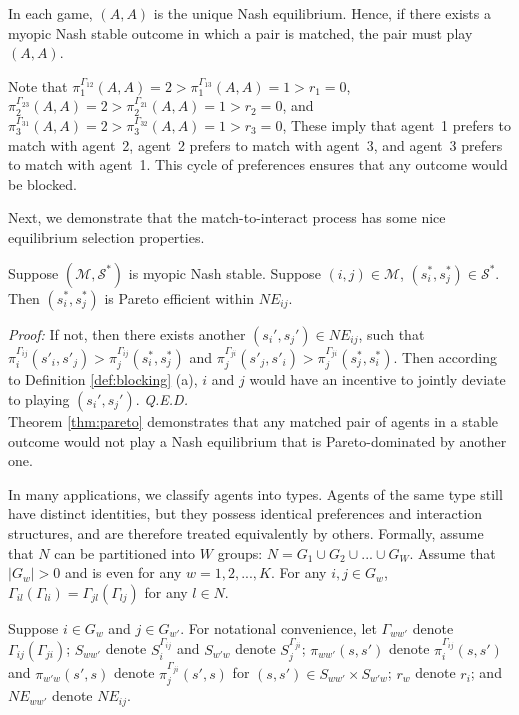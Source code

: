 \documentclass{myPaper}
\begin{document}
In each game, $(A, A)$ is the unique Nash equilibrium. Hence, if there exists a myopic Nash stable outcome in which a pair is matched, the pair must play $(A, A)$. 

 Note that $\pi_1^{\Gamma_{12}}(A,A)=2>\pi_1^{\Gamma_{13}}(A,A)=1>r_1=0$, $\pi_2^{\Gamma_{23}}(A,A)=2>\pi_2^{\Gamma_{21}}(A,A)=1>r_2=0$, and $\pi_3^{\Gamma_{31}}(A,A)=2>\pi_3^{\Gamma_{32}}(A,A)=1>r_3=0$, These imply that agent~1 prefers to match with agent~2, agent~2 prefers to match with agent~3, and agent~3 prefers to match with agent~1. This cycle of preferences ensures that any outcome would be blocked.

Next, we demonstrate that the match-to-interact process has some nice equilibrium selection properties.

\begin{theorem} \label{thm:pareto}
Suppose $(\mathcal{M}, \mathcal{S}^*)$ is myopic Nash stable. Suppose $(i, j) \in \mathcal{M}$, $(s_i^*, s_j^*)\in \mathcal{S}^*$. Then $(s_i^*, s_j^*)$ is Pareto efficient within $NE_{ij}$.
\end{theorem}
\noindent \textit{Proof:} If not, then there exists another  $(s_i', s_j') \in NE_{ij}$, such that $\pi_i^{\Gamma_{ij}}(s'_i, s'_j)>\pi_j^{\Gamma_{ij}}(s^*_i, s^*_j)$ and $\pi_j^{\Gamma_{ji}}(s'_j, s'_i)>\pi_j^{\Gamma_{ji}}(s^*_j, s^*_i)$. Then according to Definition \ref{def:blocking} (a), $i$ and $j$ would have an incentive to jointly deviate to playing $(s_i', s_j')$. \textit{Q.E.D.}
\\

Theorem \ref{thm:pareto} demonstrates that any matched pair of agents in a stable outcome would not play a Nash equilibrium that is Pareto-dominated by another one. 

In many applications, we classify agents into types. Agents of the same type still have distinct identities, but they possess identical preferences and interaction structures, and are therefore treated equivalently by others. Formally, assume that $N$ can be partitioned into $W$ groups: $N=G_1 \cup G_2 \cup ... \cup G_W$. Assume that $|G_w|>0$ and is even for any $w =1, 2, ..., K$. For any $i, j \in G_w$, $\Gamma_{il} (\Gamma_{li})=\Gamma_{jl} (\Gamma_{lj})$ for any $l \in N$.

 Suppose $i \in G_w$ and $j \in G_{w'}$. For notational convenience, let $\Gamma_{ww'}$ denote $\Gamma_{ij} (\Gamma_{ji})$; $S_{ww'}$ denote $S_i^{\Gamma_{ij}}$ and $S_{w'w}$ denote $S_j^{\Gamma_{ji}}$; $\pi_{ww'}(s, s')$ denote $\pi_i^{\Gamma_{ij}}(s, s')$ and $\pi_{w'w}(s', s)$ denote $\pi_j^{\Gamma_{ji}}(s', s)$ for $(s, s') \in S_{ww'} \times S_{w'w}$; $r_w$ denote $r_i$; and $NE_{ww'}$ denote $NE_{ij}$.
\end{document}
